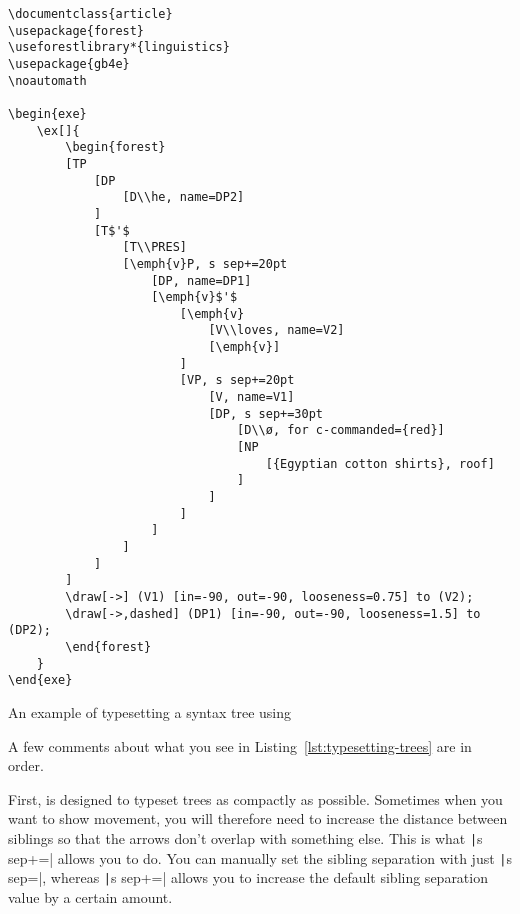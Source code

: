 \begin{listing}[htbp]
	\centering
	\begin{verbatim}
\documentclass{article}
\usepackage{forest}
\useforestlibrary*{linguistics}
\usepackage{gb4e}
\noautomath

\begin{exe}
    \ex[]{
        \begin{forest}
        [TP
            [DP
                [D\\he, name=DP2]
            ]
            [T$'$
                [T\\PRES]
                [\emph{v}P, s sep+=20pt
                    [DP, name=DP1]
                    [\emph{v}$'$
                        [\emph{v}
                            [V\\loves, name=V2]
                            [\emph{v}]
                        ]
                        [VP, s sep+=20pt
                            [V, name=V1]
                            [DP, s sep+=30pt
                                [D\\ø, for c-commanded={red}]
                                [NP
                                    [{Egyptian cotton shirts}, roof]
                                ]
                            ]
                        ]
                    ]
                ]
            ]
        ]
        \draw[->] (V1) [in=-90, out=-90, looseness=0.75] to (V2);
        \draw[->,dashed] (DP1) [in=-90, out=-90, looseness=1.5] to (DP2);
        \end{forest}
    }
\end{exe}

	\end{verbatim}
	\caption{An example of typesetting a syntax tree using }
	\label{lst:typesetting-trees}
\end{listing}

A few comments about what you see in Listing~\ref{lst:typesetting-trees} are in order.

First,  is designed to typeset trees as compactly as possible.
Sometimes when you want to show movement, you will therefore need to increase the distance between siblings so that the arrows don't overlap with something else.
This is what \texttt|s sep+=| allows you to do.
You can manually set the sibling separation with just \texttt|s sep=|, whereas \texttt|s sep+=| allows you to increase the default sibling separation value by a certain amount.

